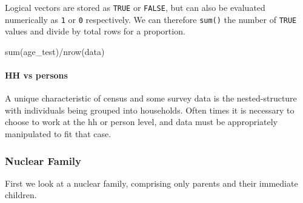 \documentclass[
]{book}
\newenvironment{Shaded}{\begin{snugshade}}{\end{snugshade}}
\newcommand{\FunctionTok}[1]{\textcolor[rgb]{0.00,0.00,0.00}{#1}}
\newcommand{\NormalTok}[1]{#1}
\newcommand{\OtherTok}[1]{\textcolor[rgb]{0.56,0.35,0.01}{#1}}
\newcommand{\SpecialCharTok}[1]{\textcolor[rgb]{0.00,0.00,0.00}{#1}}
\begin{document}
Logical vectors are stored as \texttt{TRUE} or \texttt{FALSE}, but can also be evaluated numerically as \texttt{1} or \texttt{0} respectively. We can therefore \texttt{sum()} the number of \texttt{TRUE} values and divide by total rows for a proportion.

\begin{Shaded}
\begin{Highlighting}[]
\FunctionTok{sum}\NormalTok{(age\_test)}\SpecialCharTok{/}\FunctionTok{nrow}\NormalTok{(data)}
\end{Highlighting}
\end{Shaded}

\hypertarget{hh-vs-persons}{%
\paragraph*{HH vs persons}\label{hh-vs-persons}}

A unique characteristic of census and some survey data is the nested-structure with individuals being grouped into households. Often times it is necessary to choose to work at the hh or person level, and data must be appropriately manipulated to fit that case.

\begin{Shaded}
\end{Shaded}

\hypertarget{nuclear-family}{%
\subsubsection*{Nuclear Family}\label{nuclear-family}}

First we look at a nuclear family, comprising only parents and their immediate children.
\end{document}
